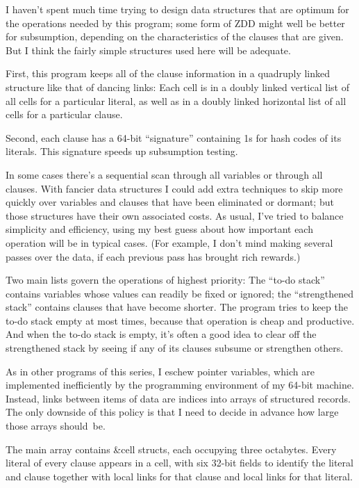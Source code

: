 \fi

I haven't spent much time trying to design data structures that
are optimum for the operations needed by this program; some form of ZDD
might well be better for subsumption, depending on the characteristics
of the clauses that are given. But I think the
fairly simple structures used here will be adequate.

First, this program keeps all of the clause
information in a quadruply linked structure like that of dancing
links: Each cell is in a doubly linked vertical list of all cells for a
particular literal, as well as in a doubly linked horizontal list of
all cells for a particular clause.

Second, each clause has a 64-bit ``signature'' containing 1s
for hash codes of its literals. This signature speeds up
subsumption testing.

In some cases there's a sequential scan through all variables
or through all clauses. With fancier data structures I could add
extra techniques to skip more quickly over variables and
clauses that have been eliminated or dormant; but those structures
have their own associated costs. As usual, I've tried to balance
simplicity and efficiency, using my best guess about how important
each operation will be in typical cases. (For example, I don't
mind making several passes over the data, if each previous pass
has brought rich rewards.)

Two main lists govern the operations of highest priority: The
``to-do stack'' contains variables whose values can readily be
fixed or ignored; the ``strengthened stack'' contains clauses
that have become shorter. The program tries to keep the to-do stack
empty at most times, because that operation is cheap and productive.
And when the to-do stack is empty, it's often a good idea to
clear off the strengthened stack by seeing if any of its
clauses subsume or strengthen others.

As in other programs of this series, I eschew pointer variables,
which are implemented inefficiently by the programming environment
of my 64-bit machine.
Instead, links between items of data
are indices into arrays of structured records.
The only downside of this policy is that I need to decide
in advance how large those arrays should~be.

\fi

The main  array contains \&{cell} structs, each occupying
three
octabytes. Every literal of every clause appears in a cell, with six
32-bit fields to identify the literal and clause together with local
 links for that clause and local  links for that literal.

